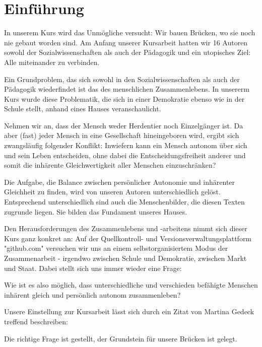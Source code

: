 \section{Einführung}

In unserem Kurs wird das Unmögliche versucht:
Wir bauen Brücken, wo sie noch nie gebaut worden sind.
Am Anfang unserer Kursarbeit hatten wir 16 Autoren sowohl der Sozialwissenschaften als auch der Pädagogik und ein utopisches Ziel: Alle miteinander zu verbinden.

Ein Grundproblem, das sich sowohl in den Sozialwissenschaften als auch der Pädagogik wiederfindet ist das des menschlichen Zusammenlebens.
In unsererm Kurs wurde diese Problematik, die sich in einer Demokratie ebenso wie in der Schule stellt, anhand eines Hauses veranschaulicht.


Nehmen wir an, dass der Mensch weder Herdentier noch Einzelgänger ist.
Da aber (fast) jeder Mensch in eine Gesellschaft hineingeboren wird, ergibt sich zwangsläufig folgender Konflikt:
Inwiefern kann ein Mensch autonom über sich und sein Leben entscheiden, ohne dabei die Entscheidungsfreiheit anderer und somit die inhärente Gleichwertigkeit aller Menschen einzuschränken?

Die Aufgabe, die Balance zwischen persönlicher Autonomie und inhärenter Gleichheit zu finden, wird von unseren Autoren unterschiedlich gelöst.
Entsprechend unterschiedlich sind auch die Menschenbilder, die diesen Texten zugrunde liegen.
Sie bilden das Fundament unseres Hauses.

Den Herausforderungen des Zusammenlebens und -arbeitens nimmt sich dieser Kurs ganz konkret an:
Auf der Quellkontroll- und Versionsverwaltungsplattform "github.com" versuchen wir uns an einem selbstorganisiertem Modus der Zusammenarbeit - irgendwo zwischen Schule und Demokratie, zwischen Markt und Staat.
Dabei stellt sich uns immer wieder eine Frage:

Wie ist es also möglich, dass unterschiedliche und verschieden befähigte Menschen inhärent gleich und persönlich autonom zusammenleben?

Unsere Einstellung zur Kursarbeit lässt sich durch ein Zitat von Martina Gedeck treffend beschreiben:


Die richtige Frage ist gestellt, der Grundstein für unsere Brücken ist gelegt.

